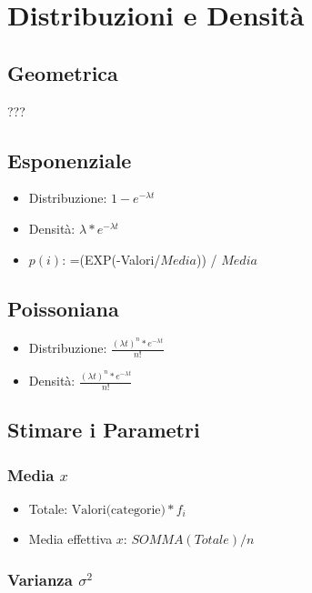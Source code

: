 \chapter{Distribuzioni e Densità}

\section{Geometrica}
???

\section{Esponenziale}

\begin{itemize}
    \item Distribuzione: $1 - e^{-\lambda t}$
    \item Densità: $\lambda * e^{-\lambda t}$
    \item $p(i)$: =(EXP(-Valori/$Media$)) / $Media$ %
\end{itemize}

\section{Poissoniana}

\begin{itemize}
    \item Distribuzione: $\frac{(\lambda t)^n * e^{-\lambda t}}{n!}$
    \item Densità: $\frac{(\lambda t)^n * e^{-\lambda t}}{n!}$
\end{itemize}

\section{Stimare i Parametri}

\subsection{Media $x$}

\begin{itemize}
    \item Totale: $\text{Valori(categorie)} * f_i$
    \item Media effettiva $x$: $SOMMA(Totale) / n$ %
\end{itemize}

\subsection{Varianza $\sigma^2$}